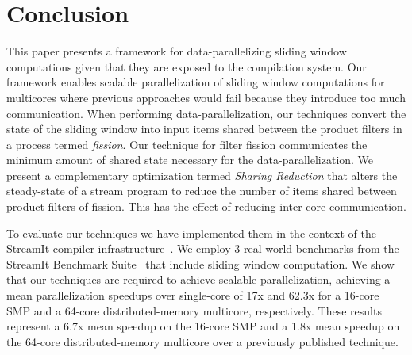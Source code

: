 \vspace{-8pt}
\section{Conclusion}


This paper presents a framework for data-parallelizing sliding window
computations given that they are exposed to the compilation system.  Our
framework enables scalable parallelization of sliding window
computations for multicores where previous approaches would fail
because they introduce too much communication.  When performing
data-parallelization, our techniques convert the state of the sliding
window into input items shared between the product filters in a
process termed {\it fission}.  Our technique for filter fission
communicates the minimum amount of shared state necessary for the
data-parallelization.  We present a complementary optimization termed
{\it Sharing Reduction} that alters the steady-state of a stream
program to reduce the number of items shared between product filters
of fission.  This has the effect of reducing inter-core communication.

To evaluate our techniques we have implemented them in the context of
the StreamIt compiler infrastructure~\cite{gordon-asplos06}.  We
employ 3 real-world benchmarks from the StreamIt Benchmark
Suite~\cite{streamit-suite} that include sliding window computation.
We show that our techniques are required to achieve scalable
parallelization, achieving a mean parallelization speedups over
single-core of 17x and 62.3x for a 16-core SMP and a 64-core
distributed-memory multicore, respectively.  These results represent a
6.7x mean speedup on the 16-core SMP and a 1.8x mean speedup on the
64-core distributed-memory multicore over a previously published
technique.



